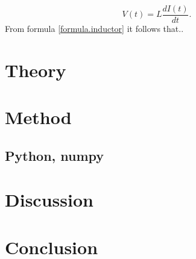 \documentclass[11pt,a4paper]{article}
\begin{document}
\begin{equation}
\label{formula.inductor}
V(t) = L \frac{dI(t)}{dt}.
\end{equation}
From formula \ref{formula.inductor} it follows that..

\section{Theory}


\section{Method}
\subsection{Python, numpy}

\section{Discussion}



\section{Conclusion}
\end{document}
